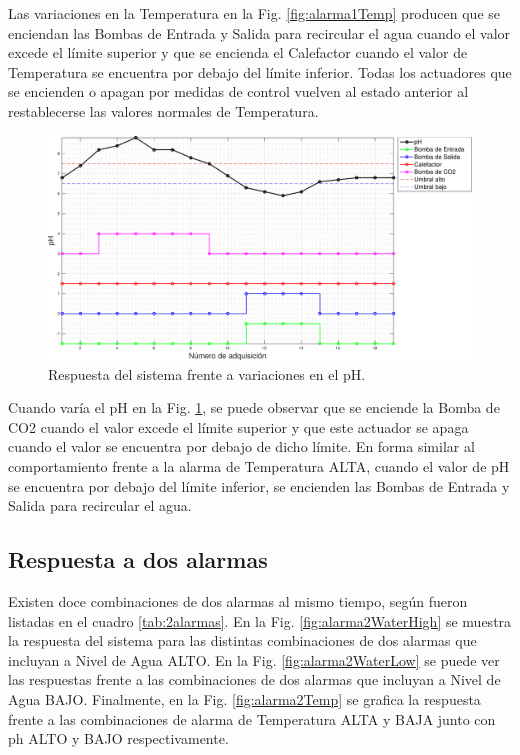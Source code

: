 Las variaciones en la Temperatura en la Fig. \ref{fig:alarma1Temp} producen que se enciendan las Bombas de Entrada y Salida para recircular el agua cuando el valor excede el límite superior y que se encienda el Calefactor cuando el valor de Temperatura se encuentra por debajo del límite inferior.  Todas los actuadores que se encienden o apagan por medidas de control vuelven al estado anterior al restablecerse las valores normales de Temperatura.

\begin{figure}[h]
\centering
    \includegraphics[width=\textwidth]{./Figures/plot1pH.pdf}
	\caption{Respuesta del sistema frente a variaciones en el pH.}
	\label{fig:alarma1pH}
\end{figure}

Cuando varía el pH en la Fig. \ref{fig:alarma1pH}, se puede observar que se enciende la Bomba de CO2 cuando el valor excede el límite superior y que este actuador se apaga cuando el valor se encuentra por debajo de dicho límite.  En forma similar al comportamiento frente a la alarma de Temperatura ALTA, cuando el valor de pH se encuentra por debajo del límite inferior, se encienden las Bombas de Entrada y Salida para recircular el agua.

\subsection{Respuesta a dos alarmas}
\label{sec:2alarma}

Existen doce combinaciones de dos alarmas al mismo tiempo, según fueron listadas en el cuadro \ref{tab:2alarmas}. En la Fig. \ref{fig:alarma2WaterHigh} se muestra la respuesta del sistema para las distintas combinaciones de dos alarmas que incluyan a Nivel de Agua ALTO.  En la Fig. \ref{fig:alarma2WaterLow} se puede ver las respuestas frente a las combinaciones de dos alarmas que incluyan a Nivel de Agua BAJO. Finalmente, en la Fig. \ref{fig:alarma2Temp} se grafica la respuesta frente a las combinaciones de alarma de Temperatura ALTA y BAJA junto con ph ALTO y BAJO respectivamente.


